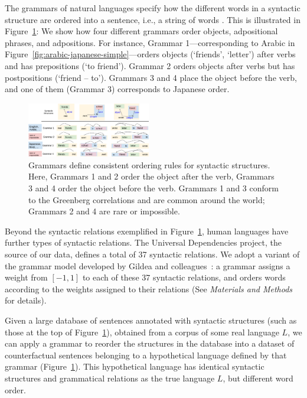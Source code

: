 \documentclass[9pt,twocolumn,twoside,lineno]{pnas-new}
\begin{document}
The grammars of natural languages specify how the different words in a syntactic structure are ordered into a sentence, i.e., a string of words  \cite{adger2015syntax}.
This is illustrated in Figure~\ref{fig:grammars}:
We show how four different grammars order objects, adpositional phrases, and adpositions.
For instance, Grammar 1---corresponding to Arabic in Figure~\ref{fig:arabic-japanese-simple}---orders objects (`friends', `letter') after verbs and has prepositions (`to friend').
Grammar 2 orders objects after verbs but has postpositions (`friend -- to').
Grammars 3 and 4 place the object before the verb, and one of them (Grammar 3) corresponds to Japanese order.

\begin{figure}[ht]
    \centering
    \includegraphics[width=0.48\textwidth]{figure3.pdf}
	\caption{Grammars define consistent ordering rules for syntactic structures. Here, Grammars 1 and 2 order the object after the verb, Grammars 3 and 4 order the object before the verb. Grammars 1 and 3 conform to the Greenberg correlations and are common around the world; Grammars 2 and 4 are rare or impossible.} %
	\label{fig:grammars}
\end{figure}

Beyond the syntactic relations exemplified in Figure~\ref{fig:grammars}, human languages have further types of syntactic relations.
The Universal Dependencies project, the source of our data, defines a total of 37 syntactic relations.
We adopt a variant of the grammar model developed by Gildea and colleagues~\cite{gildea2007optimizing,gildea2010grammars,gildea2015human}: a grammar assigns a weight from $[-1,1]$ to each of these 37 syntactic relations, and orders words according to the weights assigned to their relations
(See \textit{Materials and Methods} for details).

Given a large database of sentences annotated with syntactic structures (such as those at the top of Figure~\ref{fig:grammars}), obtained from a corpus of some real language $L$, we can apply a grammar to reorder the structures in the database into a dataset of counterfactual sentences belonging to a hypothetical language defined by that grammar (Figure~\ref{fig:grammars}).
This hypothetical language has identical syntactic structures and grammatical relations as the true language $L$, but different word order.
\end{document}
